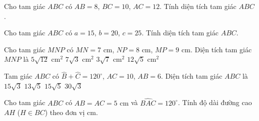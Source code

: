 \begin{bt}%
	Cho tam giác $ABC$ có $AB=8$, $BC=10$, $AC=12$. Tính diện tích tam giác $ABC$.
\end{bt}

\begin{bt}%
	Cho tam giác $ABC$ có $a=15$, $b=20$, $c=25$. Tính diện tích tam giác $ABC$.
\end{bt}

\begin{ex}%
	Cho tam giác $MNP$ có $MN=7\text{ cm}$, $NP=8\text{ cm}$, $MP=9\text{ cm}$. Diện tích tam giác $MNP$ là
	\choice
		{$5\sqrt{12}\text{ cm}^2$}
		{$7\sqrt{3}\text{ cm}^2$}
		{$3\sqrt{7}\text{ cm}^2$}
		{\True $12\sqrt{5}\text{ cm}^2$}
\end{ex}

\begin{ex}%
	Tam giác $ABC$ có $\widehat{B}+\widehat{C}=120^\circ$, $AC=10$, $AB=6$. Diện tích tam giác $ABC$ là
	\choice
		{\True $15\sqrt{3}$}
		{$13\sqrt{5}$}
		{$15\sqrt{5}$}
		{$30\sqrt{3}$}
\end{ex}

\begin{bt}%
	Cho tam giác $ABC$ có $AB=AC=5\text{ cm}$ và $\widehat{BAC}=120^\circ$. Tính độ dài đường cao $AH$ ($H\in BC$) theo đơn vị cm.
\end{bt}

